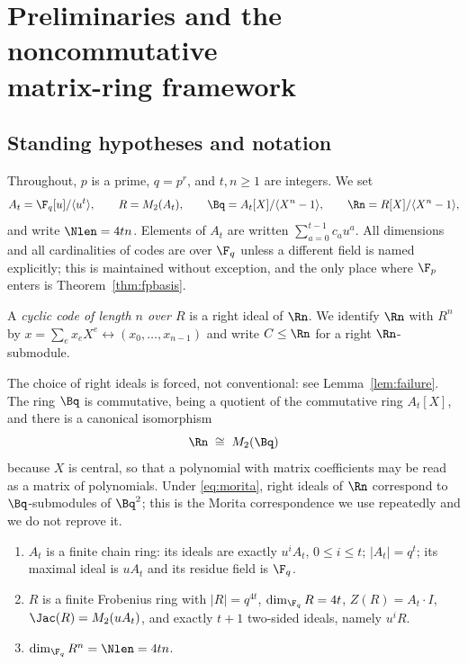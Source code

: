 \section[Preliminaries and the noncommutative matrix-ring framework]%
  {Preliminaries and the noncommutative\\ matrix-ring framework}
\label{sec:prelim}

\subsection{Standing hypotheses and notation}

Throughout, $p$ is a prime, $q=p^r$, and $t,n\ge1$ are integers. We set
\begin{equation}\label{eq:rings}
  A_t=\F_q[u]/\langle u^t\rangle,\qquad
  R=M_2(A_t),\qquad
  \Bq=A_t[X]/\langle X^n-1\rangle,\qquad
  \Rn=R[X]/\langle X^n-1\rangle ,
\end{equation}
and write $\Nlen=4tn$. Elements of $A_t$ are written $\sum_{a=0}^{t-1}c_au^a$.
All dimensions and all cardinalities of codes are over $\F_q$ unless a different
field is named explicitly; this is maintained without exception, and the only
place where $\F_p$ enters is Theorem~\ref{thm:fpbasis}.

\begin{definition}\label{def:code}
A \emph{cyclic code of length $n$ over $R$} is a right ideal of $\Rn$. We
identify $\Rn$ with $R^n$ by $x=\sum_ex_eX^e\leftrightarrow(x_0,\dots,x_{n-1})$
and write $C\le \Rn$ for a right $\Rn$-submodule.
\end{definition}

The choice of right ideals is forced, not conventional: see
Lemma~\ref{lem:failure}. The ring $\Bq$ is commutative, being a quotient of the
commutative ring $A_t[X]$, and there is a canonical isomorphism
\begin{equation}\label{eq:morita}
  \Rn \;\cong\; M_2(\Bq)
\end{equation}
because $X$ is central, so that a polynomial with matrix coefficients may be
read as a matrix of polynomials. Under \eqref{eq:morita}, right ideals of
$\Rn$ correspond to $\Bq$-submodules of $\Bq^2$; this is the Morita
correspondence we use repeatedly and we do not reprove it.

\begin{lemma}\label{lem:basic}
\begin{enumerate}[label=\textnormal{(\alph*)},leftmargin=*]
\item $A_t$ is a finite chain ring: its ideals are exactly
  $u^iA_t$, $0\le i\le t$; $|A_t|=q^t$; its maximal ideal is $uA_t$ and its
  residue field is $\F_q$.
\item $R$ is a finite Frobenius ring with $|R|=q^{4t}$,
  $\dim_{\F_q}R=4t$, $Z(R)=A_t\cdot I$, $\Jac(R)=M_2(uA_t)$, and exactly $t+1$
  two-sided ideals, namely $u^iR$.
\item $\dim_{\F_q}R^n=\Nlen=4tn$.
\end{enumerate}
\end{lemma}

